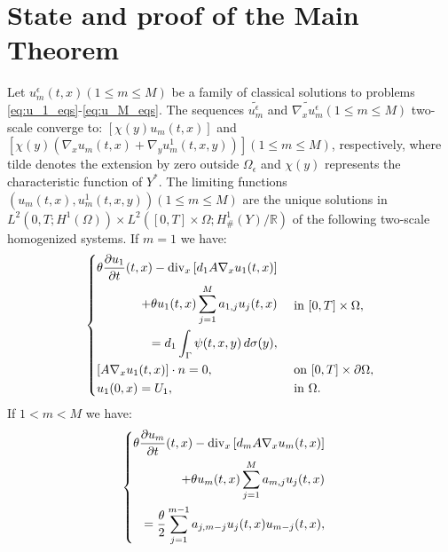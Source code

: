 \section{State and proof of the Main Theorem}
\begin{theorem} Let $u_{m}^{\epsilon}(t, x)(1 \leq m \leq M)$ be a family of classical solutions to problems \eqref{eq:u_1_eqs}-\eqref{eq:u_M_eqs}. The sequences $\widetilde{u_{m}^{\epsilon}}$ and $\widetilde{\nabla_{x} u_{m}^{\epsilon}}(1 \leq m \leq M)$ two-scale converge to: $\left[\chi(y) u_{m}(t, x)\right]$ and $\left[\chi(y)\left(\nabla_{x} u_{m}(t, x)+\nabla_{y} u_{m}^{1}(t, x, y)\right)\right](1 \leq m \leq M)$, respectively, where tilde denotes the extension by zero outside $\Omega_{\epsilon}$ and $\chi(y)$ represents the characteristic function of $Y^{*}$. The limiting functions $\left(u_{m}(t, x), u_{m}^{1}(t, x, y)\right)(1 \leq m \leq M)$ are the unique solutions in $L^{2}\left(0, T ; H^{1}(\Omega)\right) \times L^{2}\left([0, T] \times \Omega ; H_{\#}^{1}(Y) / \mathbb{R}\right)$ of the following two-scale homogenized systems.
If $m=1$ we have:
\begin{equation}
  \begin{dcases}
   \begin{split}
     \theta \frac{\partial u_{1}}{\partial t}(t, x)-\operatorname{div}_{x}\left[d_{1} A \nabla_{x} u_{1}(t, x)\right] \\  +\theta u_{1}(t, x) \sum_{j=1}^{M} a_{1, j} u_{j}(t, x) \\ =d_{1} \int_{\Gamma} \psi(t, x, y) \, d  \sigma(y), 
   \end{split} & \text { in }[0, T]\times\Omega, \\
    {\left[A \nabla_{x} u_{1}(t, x)\right] \cdot n=0}, & \text { on }[0, T]\times\partial\Omega, \\ 
    u_{1}(0, x)=U_{1}, & \text { in }\Omega. \\ 
\end{dcases}
\label{eq 16}
\end{equation}
If $1<m<M$ we have:
\begin{equation}
  \begin{dcases}
    \begin{split}
        \theta \frac{\partial u_{m}}{\partial t}(t, x)-\operatorname{div}_{x}\left[d_{m} A \nabla_{x} u_{m}(t, x)\right] \\ +\theta u_{m}(t, x) \sum_{j=1}^{M} a_{m, j} u_{j}(t, x) & \\ =\frac{\theta}{2} \sum_{j=1}^{m-1} a_{j, m-j} u_{j}(t, x) u_{m-j}(t, x), 

\end{split}
\end{dcases}
\end{equation}
\end{theorem}
